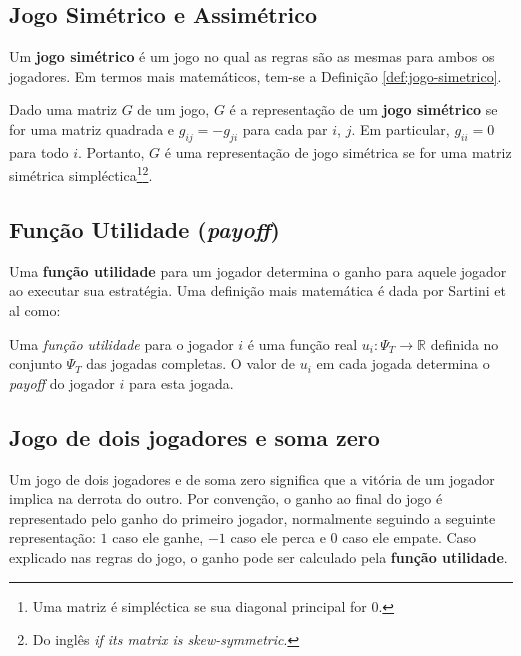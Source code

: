 \subsection{Jogo Simétrico e Assimétrico}
\label{subsec:jogo-simetrico-e-assimetrico}

Um \textbf{jogo simétrico} é um jogo no qual as regras são as mesmas para ambos os jogadores. Em termos mais matemáticos, tem-se a Definição \ref{def:jogo-simetrico}.

\begin{mydef}\label{def:jogo-simetrico}
Dado uma matriz $G$ de um jogo, $G$ é a representação de um \textbf{jogo simétrico} se for uma matriz quadrada e $g_{ij} = -g_{ji}$ para cada par $i$, $j$. Em particular, $g_{ii} = 0$ para todo $i$. Portanto, $G$ é uma representação de jogo simétrica se for uma matriz simétrica simpléctica\footnote{Uma matriz é simpléctica se sua diagonal principal for 0.}\footnote{Do inglês \emph{if its matrix is skew-symmetric}.}. \cite{jones_1980}
\end{mydef}

\subsection{Função Utilidade (\emph{payoff})}
\label{subsec:funcao-utilidade}

Uma \textbf{função utilidade} para um jogador determina o ganho para aquele jogador ao executar sua estratégia. Uma definição mais matemática é dada por Sartini et al como:

\begin{mydef}\label{def:funcao-utilidade}
Uma \emph{função utilidade} para o jogador $i$ é uma função real $u_i:\Psi_T \rightarrow \mathbb{R}$ definida no conjunto $\Psi_T$ das jogadas completas. O valor de $u_i$ em cada jogada determina o \emph{payoff} do jogador $i$ para esta jogada. \cite{sartini_IIbienaldasbm}
\end{mydef}

\subsection{Jogo de dois jogadores e soma zero}
\label{subsec:jogo-de-dois-jogadores-e-soma-zero}

Um jogo de dois jogadores e de soma zero significa que a vitória de um jogador implica na derrota do outro. Por convenção, o ganho ao final do jogo é representado pelo ganho do primeiro jogador, normalmente seguindo a seguinte representação: $1$ caso ele ganhe, $-1$ caso ele perca e $0$ caso ele empate. Caso explicado nas regras do jogo, o ganho pode ser calculado pela \textbf{função utilidade}.


